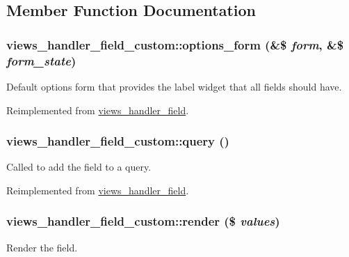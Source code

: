 \subsection{Member Function Documentation}
\hypertarget{classviews__handler__field__custom_a886688de7d2ac5bc4ef3b588a2e5056a}{
\subsubsection[{options\_\-form}]{\setlength{\rightskip}{0pt plus 5cm}views\_\-handler\_\-field\_\-custom::options\_\-form (\&\$ {\em form}, \/  \&\$ {\em form\_\-state})}}
\label{classviews__handler__field__custom_a886688de7d2ac5bc4ef3b588a2e5056a}
Default options form that provides the label widget that all fields should have. 

Reimplemented from \hyperlink{classviews__handler__field_a0435d161922b7b4b84f02a2e79bb947a}{views\_\-handler\_\-field}.\hypertarget{classviews__handler__field__custom_a153c21f3d05ff9f27e345f2c98058bc4}{
\subsubsection[{query}]{\setlength{\rightskip}{0pt plus 5cm}views\_\-handler\_\-field\_\-custom::query ()}}
\label{classviews__handler__field__custom_a153c21f3d05ff9f27e345f2c98058bc4}
Called to add the field to a query. 

Reimplemented from \hyperlink{classviews__handler__field_a4f661f91bcbe80d4a00c30a31456c502}{views\_\-handler\_\-field}.\hypertarget{classviews__handler__field__custom_a0498d3ad0dff40c9e49ec599363c2157}{
\subsubsection[{render}]{\setlength{\rightskip}{0pt plus 5cm}views\_\-handler\_\-field\_\-custom::render (\$ {\em values})}}
\label{classviews__handler__field__custom_a0498d3ad0dff40c9e49ec599363c2157}
Render the field.


